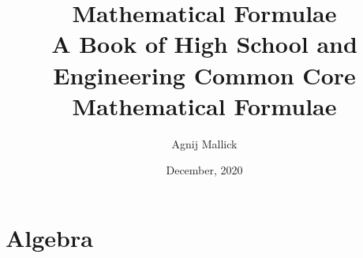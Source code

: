 \documentclass[openany, oneside]{book}
\title{Mathematical Formulae\\A Book of High School and Engineering Common Core Mathematical Formulae}
\date{December, 2020}
\author{Agnij Mallick}
\begin{document}
	\maketitle
	\tableofcontents

	\part{Algebra}
			
		
		
		
		
		
		
		
		
\end{document}
